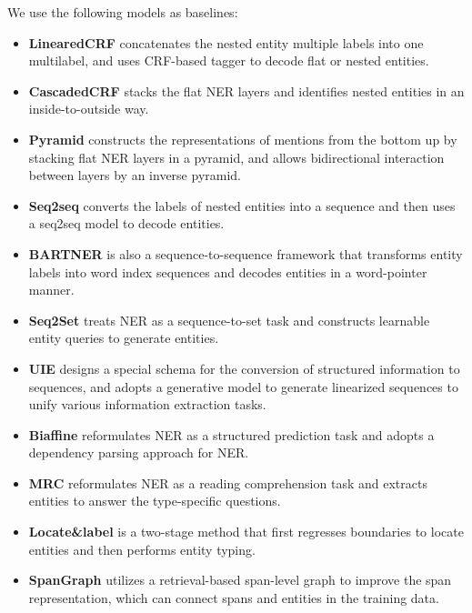 \documentclass[11pt]{article}
\begin{document}
We use the following models as baselines:

\begin{itemize}
    \item \textbf{LinearedCRF} \citep{strakova-etal-2019-neural} concatenates the nested
entity multiple labels into one multilabel, and uses CRF-based tagger to decode flat or nested entities.
    \item \textbf{CascadedCRF} \citep{ju-etal-2018-neural} stacks the flat NER layers and identifies nested entities in an inside-to-outside way.
    \item \textbf{Pyramid} \citep{wang-etal-2020-pyramid} constructs the representations of mentions from the bottom up by stacking flat NER layers in a pyramid, and allows bidirectional interaction between layers by an inverse pyramid.
    \item \textbf{Seq2seq} \citep{strakova-etal-2019-neural} converts the labels of nested entities into a sequence and then uses a seq2seq model to decode entities.
    \item \textbf{BARTNER} \citep{yan-etal-2021-unified-generative} is also a sequence-to-sequence framework that transforms entity labels into word index sequences and decodes entities in a word-pointer manner.
    \item \textbf{Seq2Set} \citep{ijcai2021-542}treats NER as a sequence-to-set task and constructs learnable entity queries to generate entities.
    \item \textbf{UIE} \citep{lu-etal-2022-unified} designs a special schema for the conversion of structured information to sequences, and adopts a generative model to generate linearized sequences to unify various information extraction tasks.
    \item \textbf{Biaffine} \citep{yu-etal-2020-named} reformulates NER as a structured prediction task and adopts a dependency parsing approach for NER.
    \item \textbf{MRC} \citep{li-etal-2020-unified} reformulates NER as a reading comprehension task and extracts entities to answer the type-specific questions.
    \item \textbf{Locate\&label} \citep{shen-etal-2021-locate} is a two-stage method that first regresses boundaries to locate entities and then performs entity typing.
    \item \textbf{SpanGraph} \citep{wan-etal-2022-nested} utilizes a retrieval-based span-level graph to improve the span representation, which can connect spans and entities in the training data.

\end{itemize}
\end{document}
